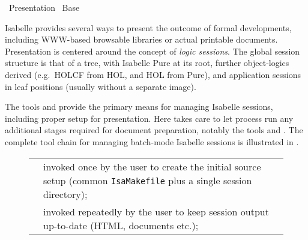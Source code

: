 %
\begin{isabellebody}%
\def\isabellecontext{Presentation}%
%
\isadelimtheory
%
\endisadelimtheory
%
\isatagtheory
{}\isamarkupfalse%
\ Presentation\isanewline
{}\ Base\isanewline
{}%
\endisatagtheory
{\isafoldtheory}%
%
\isadelimtheory
%
\endisadelimtheory
%
\isamarkuptrue%
%
\begin{isamarkuptext}%
Isabelle provides several ways to present the outcome of formal
  developments, including WWW-based browsable libraries or actual
  printable documents.  Presentation is centered around the concept of
  \emph{logic sessions}.  The global session structure is that of a
  tree, with Isabelle Pure at its root, further object-logics derived
  (e.g.\ HOLCF from HOL, and HOL from Pure), and application sessions
  in leaf positions (usually without a separate image).

  The tools \hyperlink{tool.mkdir}{\mbox{}} and \hyperlink{tool.make}{\mbox{}} provide the primary
  means for managing Isabelle sessions, including proper setup for
  presentation.  Here \hyperlink{tool.usedir}{\mbox{}} takes care to let
  \hyperlink{executable.isabelle-process}{\mbox{}} process run any additional
  stages required for document preparation, notably the tools
  \hyperlink{tool.document}{\mbox{}} and \hyperlink{tool.latex}{\mbox{}}.  The complete tool chain
  for managing batch-mode Isabelle sessions is illustrated in
  .

  \begin{figure}[htbp]
  \begin{center}
  \begin{tabular}{lp{}}

      \indexref{}{tool}{mkdir}\hyperlink{tool.mkdir}{\mbox{\isa{\isatool{mkdir}}}} & invoked once by the user to create the
      initial source setup (common \verb|IsaMakefile| plus a
      single session directory); \\

      \hyperlink{tool.make}{\mbox{\isa{\isatool{make}}}} & invoked repeatedly by the user to keep session
      output up-to-date (HTML, documents etc.); \\


\end{tabular}
\end{center}
\end{figure}
\end{isamarkuptext}
\end{isabellebody}
